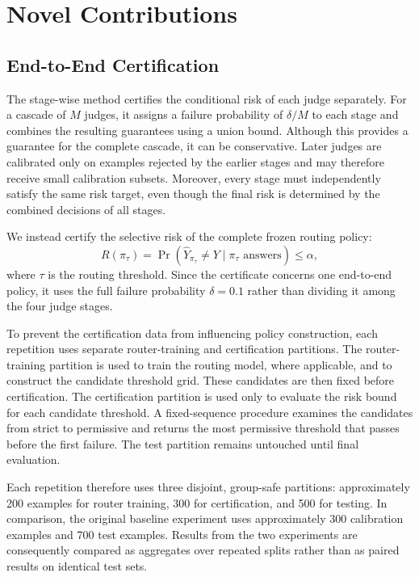 \documentclass[11pt]{article}
\begin{document}
\section{Novel Contributions}

\subsection{End-to-End Certification}

The stage-wise method certifies the conditional risk of each judge separately. For a cascade of $M$ judges, it assigns a failure probability of $\delta/M$ to each stage and combines the resulting guarantees using a union bound. Although this provides a guarantee for the complete cascade, it can be conservative. Later judges are calibrated only on examples rejected by the earlier stages and may therefore receive small calibration subsets. Moreover, every stage must independently satisfy the same risk target, even though the final risk is determined by the combined decisions of all stages.

We instead certify the selective risk of the complete frozen routing policy:
\begin{equation}
R(\pi_{\tau})
=
\Pr\!\left(
\widehat{Y}_{\pi_{\tau}}\ne Y
\mid
\pi_{\tau}\text{ answers}
\right)
\leq \alpha,
\label{eq:global-risk}
\end{equation}
where $\tau$ is the routing threshold. Since the certificate concerns one end-to-end policy, it uses the full failure probability $\delta=0.1$ rather than dividing it among the four judge stages.

To prevent the certification data from influencing policy construction, each repetition uses separate router-training and certification partitions. The router-training partition is used to train the routing model, where applicable, and to construct the candidate threshold grid. These candidates are then fixed before certification. The certification partition is used only to evaluate the risk bound for each candidate threshold. A fixed-sequence procedure examines the candidates from strict to permissive and returns the most permissive threshold that passes before the first failure. The test partition remains untouched until final evaluation.

Each repetition therefore uses three disjoint, group-safe partitions: approximately 200 examples for router training, 300 for certification, and 500 for testing. In comparison, the original baseline experiment uses approximately 300 calibration examples and 700 test examples. Results from the two experiments are consequently compared as aggregates over repeated splits rather than as paired results on identical test sets.
\end{document}
